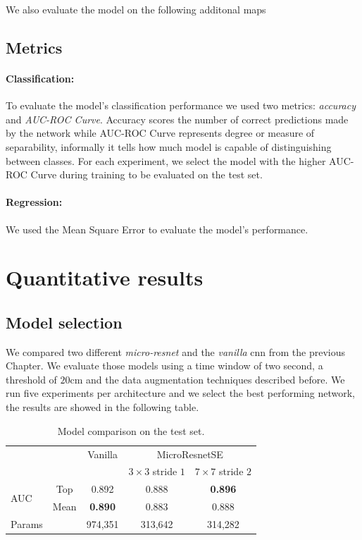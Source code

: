 \documentclass[../document.tex]{subfiles}
\begin{document}
We also evaluate the model on the following additonal maps
\subsection{Metrics}

\paragraph{Classification:} To evaluate the model's classification performance we used two metrics: \emph{accuracy} and \emph{AUC-ROC Curve}. Accuracy scores the number of correct predictions made by the network while AUC-ROC Curve represents degree or measure of separability, informally it tells how much model is capable of distinguishing between classes. For each experiment, we select the model with the higher AUC-ROC Curve during training to be evaluated on the test set.



\paragraph{Regression:} We used the Mean Square Error to evaluate the model's performance.
\section{Quantitative results}
\subsection{Model selection}
We compared two different \emph{micro-resnet} and the \emph{vanilla} cnn from the previous Chapter. We evaluate those models using a time window of two second, a threshold of $20$cm and the data augmentation techniques described before. We run five experiments per architecture and we select the best performing network, the results are showed in the following table. 

\begin{table}[ht]
  \centering
  \begin{tabular}{@{}lcccc@{}}
  \toprule
   && Vanilla & \multicolumn{2}{c}{MicroResnetSE} \\
  \cline{3-5}
  && & $3\times 3$ stride $1$ & $7\times7$ stride $2$\\ 
  \cline{3-5}
  \multirow{2}{*}{AUC} & Top & 0.892 & 0.888 & \textbf{0.896}\\
   & Mean & \textbf{0.890} & 0.883 & 0.888\\
  \cline{1-5}
  Params & & 974,351 & 313,642 & 314,282  \\
  \bottomrule   
\end{tabular}
\caption{Model comparison on the test set.}
\end{table}
\end{document}
